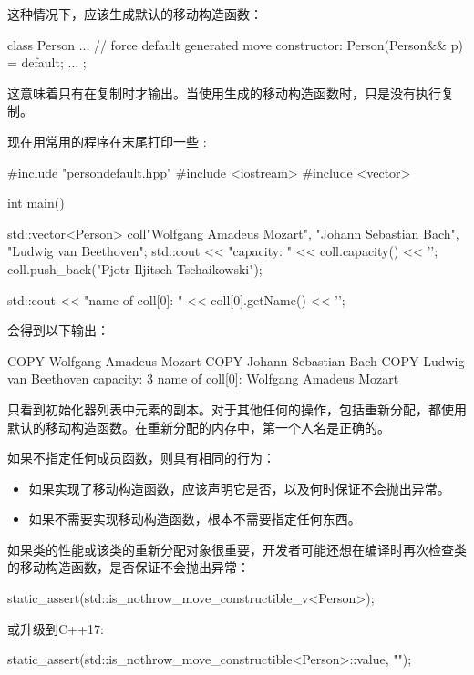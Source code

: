 这种情况下，应该生成默认的移动构造函数：

\begin{cppcode}
class Person {
	...
	// force default generated move constructor:
	Person(Person&& p) = default;
	...
};
\end{cppcode}

这意味着只有在复制时才输出。当使用生成的移动构造函数时，只是没有执行复制。

现在用常用的程序在末尾打印一些 :

\begin{cppcode}
#include "persondefault.hpp"
#include <iostream>
#include <vector>

int main()
{
	std::vector<Person> coll{"Wolfgang Amadeus Mozart",
		"Johann Sebastian Bach",
		"Ludwig van Beethoven"};
	std::cout << "capacity: " << coll.capacity() << '\n';
	coll.push_back("Pjotr Iljitsch Tschaikowski");

	std::cout << "name of coll[0]: " << coll[0].getName() << '\n';
}
\end{cppcode}

会得到以下输出：

\begin{outputcode}
COPY Wolfgang Amadeus Mozart
COPY Johann Sebastian Bach
COPY Ludwig van Beethoven
capacity: 3
name of coll[0]: Wolfgang Amadeus Mozart
\end{outputcode}

只看到初始化器列表中元素的副本。对于其他任何的操作，包括重新分配，都使用默认的移动构造函数。在重新分配的内存中，第一个人名是正确的。

如果不指定任何成员函数，则具有相同的行为：

\begin{itemize}
	\item 如果实现了移动构造函数，应该声明它是否，以及何时保证不会抛出异常。
	\item 如果不需要实现移动构造函数，根本不需要指定任何东西。
\end{itemize}

如果类的性能或该类的重新分配对象很重要，开发者可能还想在编译时再次检查类的移动构造函数，是否保证不会抛出异常：

\begin{cppcode}
static_assert(std::is_nothrow_move_constructible_v<Person>);
\end{cppcode}

或升级到C++17:

\begin{cppcode}
static_assert(std::is_nothrow_move_constructible<Person>::value, "");
\end{cppcode}

